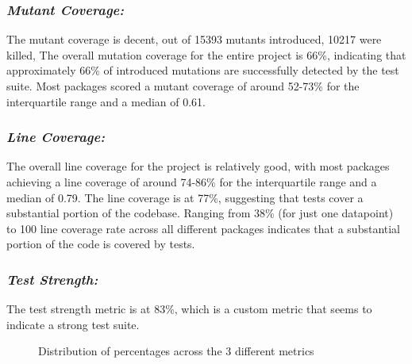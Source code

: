 \documentclass[sigconf]{acmart}
\begin{document}
\subsubsection{\textit{\textbf{Mutant Coverage:}}}
The mutant coverage is decent, out of 15393 mutants introduced, 10217 were killed, The overall mutation coverage for the entire project is 66\%, indicating that approximately 66\% of introduced mutations are successfully detected by the test suite. Most packages scored a mutant coverage of around 52-73\% for the interquartile range and a median of 0.61.
\subsubsection{\textit{\textbf{Line Coverage:}}}
The overall line coverage for the project is relatively good, with most packages achieving a line coverage of around 74-86\% for the interquartile range and a median of 0.79. The line coverage is at 77\%, suggesting that tests cover a substantial portion of the codebase. Ranging from 38\% (for just one datapoint) to 100 line coverage rate across all different packages indicates that a substantial portion of the code is covered by tests.
\subsubsection{\textit{\textbf{Test Strength:}}}
The test strength metric is at 83\%, which is a custom metric that seems to indicate a strong test suite.

\begin{figure}[h!]
\centering
{}
 \caption{Distribution of percentages across the 3 different metrics}
\end{figure}
\end{document}

